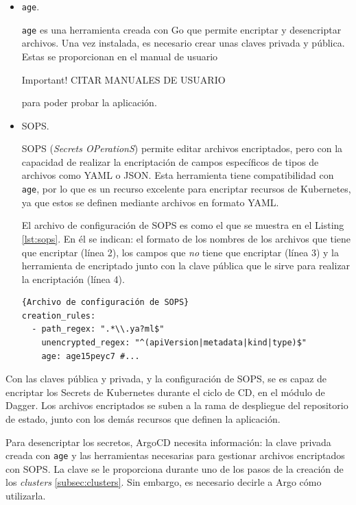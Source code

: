 \begin{itemize}
  \item \texttt{age}\cite{age}.

    \texttt{age} es una herramienta creada con Go que permite encriptar y desencriptar archivos. Una vez instalada, es necesario crear unas claves privada y pública. Estas se proporcionan en el manual de usuario
    \begin{bclogo}[logo=\bcattention]{Important!}
      CITAR MANUALES DE USUARIO
    \end{bclogo}
    para poder probar la aplicación.
  \item SOPS\cite{sops}.

    SOPS (\textit{Secrets OPerationS}) permite editar archivos encriptados, pero con la capacidad de realizar la encriptación de campos específicos de tipos de archivos como YAML o JSON. Esta herramienta tiene compatibilidad con \texttt{age}, por lo que es un recurso excelente para encriptar recursos de Kubernetes, ya que estos se definen mediante archivos en formato YAML.

    El archivo de configuración de SOPS es como el que se muestra en el Listing \ref{lst:sops}. En él se indican: el formato de los nombres de los archivos que tiene que encriptar (línea 2), los campos que \textit{no} tiene que encriptar (línea 3) y la herramienta de encriptado junto con la clave pública que le sirve para realizar la encriptación (línea 4).

\begin{lstlisting}[language=helm,label=lst:sops]{Archivo de configuración de SOPS}
creation_rules:
  - path_regex: ".*\\.ya?ml$"
    unencrypted_regex: "^(apiVersion|metadata|kind|type)$"
    age: age15peyc7 #...
\end{lstlisting}

\end{itemize}

Con las claves pública y privada, y la configuración de SOPS, se es capaz de encriptar los Secrets de Kubernetes durante el ciclo de CD, en el módulo de Dagger. Los archivos encriptados se suben a la rama de despliegue del repositorio de estado, junto con los demás recursos que definen la aplicación.

Para desencriptar los secretos, ArgoCD necesita información: la clave privada creada con \texttt{age} y las herramientas necesarias para gestionar archivos encriptados con SOPS. La clave se le proporciona durante uno de los pasos de la creación de los \textit{clusters} \ref{subsec:clusters}. Sin embargo, es necesario decirle a Argo cómo utilizarla.

